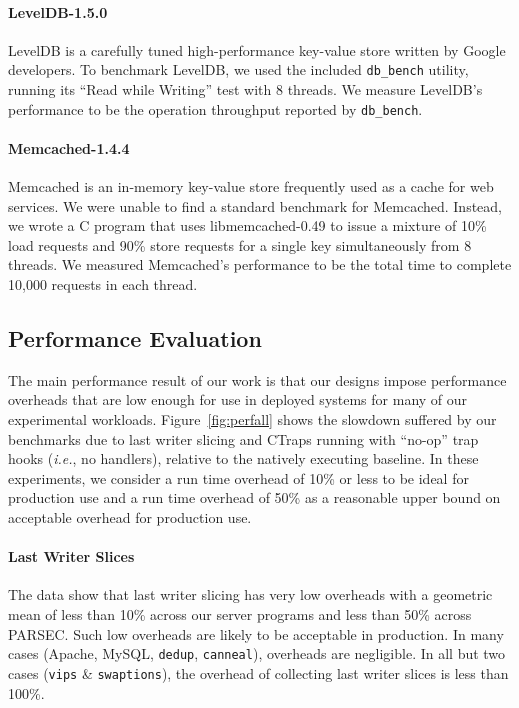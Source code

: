 \documentclass[preprint,9pt]{sigplanconf}
\newcommand{\ctraps}{CTraps\xspace}
\begin{document}
\paragraph{LevelDB-1.5.0}
LevelDB is a carefully tuned high-performance key-value store written by Google
developers. To benchmark LevelDB, we used the included {\tt db\_bench} utility,
running its ``Read while Writing'' test with 8 threads.  We measure LevelDB's
performance to be the operation throughput reported by {\tt db\_bench}.

\paragraph{Memcached-1.4.4}
Memcached is an in-memory key-value store frequently used as a cache for web
services.  We were unable to find a standard benchmark for Memcached.  Instead,
we wrote a C program that uses libmemcached-0.49 to issue a
mixture of 10\% load requests and 90\% store requests for a single key 
simultaneously from 8 threads.  We measured Memcached's performance to be the
total time to complete 10,000 requests in each thread.



\subsection{Performance Evaluation}
\label{sec:eval:perf}

The main performance result of our work is that our designs impose performance
overheads that are low enough for use in deployed systems for many of our
experimental workloads.  Figure~\ref{fig:perfall} shows the slowdown suffered
by our benchmarks due to last writer slicing and \ctraps running with ``no-op''
trap hooks ({\em i.e.}, no handlers), relative to the natively executing
baseline.  In these experiments, we consider a run time overhead of 10\% or
less to be ideal for production use and a run time overhead of 50\% as
a reasonable upper bound on acceptable overhead for production use.

\paragraph{Last Writer Slices}
The data show that last writer slicing has very low overheads with a geometric
mean of less than 10\% across our server programs and less than 50\% across
PARSEC.  Such low overheads are likely to be acceptable in production.  In many
cases (Apache, MySQL, {\tt dedup}, {\tt canneal}), overheads are negligible.
In all but two cases ({\tt vips} \& {\tt swaptions}), the overhead of
collecting last writer slices is less than 100\%.    
\end{document}
